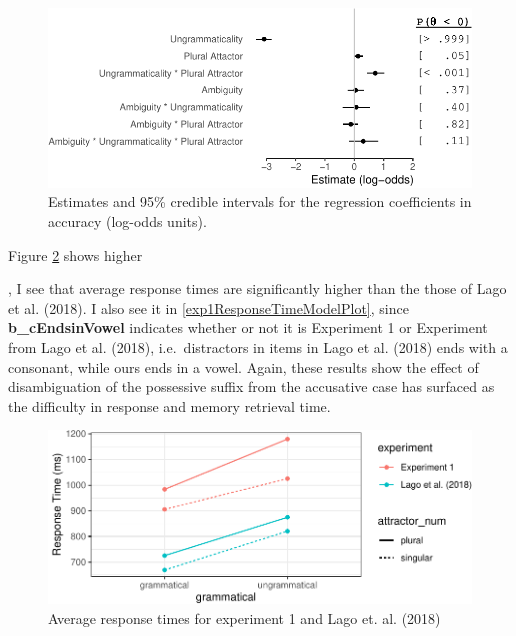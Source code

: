 \documentclass[doc]{apa6}
\begin{document}
\begin{figure}
\centering
\includegraphics{paper_draft_files/figure-latex/exp1ResponseModelPlot-1.pdf}
\caption{\label{fig:exp1ResponseModelPlot}Estimates and 95\% credible intervals for the regression coefficients in accuracy (log-odds units).}
\end{figure}

Figure \ref{fig:exp1AvgRTs} shows higher

, I see that average response times are significantly higher than the those of Lago et al. (2018). I also see it in \ref{exp1ResponseTimeModelPlot}, since \textbf{b\_cEndsinVowel} indicates whether or not it is Experiment 1 or Experiment from Lago et al. (2018), i.e.~distractors in items in Lago et al. (2018) ends with a consonant, while ours ends in a vowel. Again, these results show the effect of disambiguation of the possessive suffix from the accusative case has surfaced as the difficulty in response and memory retrieval time.

\begin{figure}
\centering
\includegraphics{paper_draft_files/figure-latex/exp1AvgRTs-1.pdf}
\caption{\label{fig:exp1AvgRTs}Average response times for experiment 1 and Lago et. al. (2018)}
\end{figure}
\end{document}
